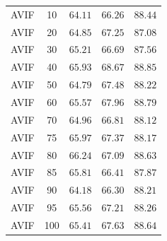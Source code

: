 \begin{table}[htbp]
\begin{tabular}{lcccc}
AVIF & 10 & $64.11$ & $66.26$ & $88.44$ \\
AVIF & 20 & $64.85$ & $67.25$ & $87.08$ \\
AVIF & 30 & $65.21$ & $66.69$ & $87.56$ \\
AVIF & 40 & $65.93$ & $68.67$ & $88.85$ \\
AVIF & 50 & $64.79$ & $67.48$ & $88.22$ \\
AVIF & 60 & $65.57$ & $67.96$ & $88.79$ \\
AVIF & 70 & $64.96$ & $66.81$ & $88.12$ \\
AVIF & 75 & $65.97$ & $67.37$ & $88.17$ \\
AVIF & 80 & $66.24$ & $67.09$ & $88.63$ \\
AVIF & 85 & $65.81$ & $66.41$ & $87.87$ \\
AVIF & 90 & $64.18$ & $66.30$ & $88.21$ \\
AVIF & 95 & $65.56$ & $67.21$ & $88.26$ \\
AVIF & 100 & $65.41$ & $67.63$ & $88.64$ \\
\hline
\end{tabular}
\end{table}